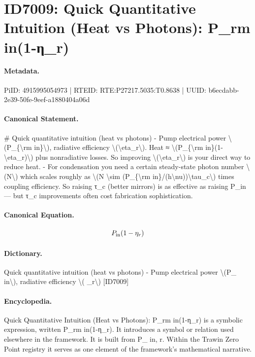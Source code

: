 \section*{ID7009: Quick Quantitative Intuition (Heat vs Photons): P\_rm in(1-η\_r)}
\paragraph{Metadata.}
PiID: 4915995054973 | RTEID: RTE:P27217.5035:T0.8638 | UUID: b6ecdabb-2e39-50fe-9eef-a1880404a06d

\paragraph{Canonical Statement.}
\# Quick quantitative intuition (heat vs photons) - Pump electrical power \textbackslash{}(P\_\{\textbackslash{}rm in\}\textbackslash{}), radiative efficiency \textbackslash{}(\textbackslash{}eta\_r\textbackslash{}). Heat ≈ \textbackslash{}(P\_\{\textbackslash{}rm in\}(1-\textbackslash{}eta\_r)\textbackslash{}) plus nonradiative losses. So improving \textbackslash{}(\textbackslash{}eta\_r\textbackslash{}) is your direct way to reduce heat. - For condensation you need a certain steady-state photon number \textbackslash{}(N\textbackslash{}) which scales roughly as \textbackslash{}(N \textbackslash{}sim (P\_\{\textbackslash{}rm in\}/(h\textbackslash{}nu))\textbackslash{}tau\_c\textbackslash{}) times coupling efficiency. So raising τ\_c (better mirrors) is as effective as raising P\_in — but τ\_c improvements often cost fabrication sophistication.

\paragraph{Canonical Equation.}
\[
P_{\rm in}(1-\eta_r)
\]

\paragraph{Dictionary.}
Quick quantitative intuition (heat vs photons) - Pump electrical power \textbackslash{}(P\_ in\textbackslash{}), radiative efficiency \textbackslash{}( \_r\textbackslash{}) [ID7009]

\paragraph{Encyclopedia.}
Quick Quantitative Intuition (Heat vs Photons): P\_rm in(1-η\_r) is a symbolic expression, written P\_rm in(1-η\_r). It introduces a symbol or relation used elsewhere in the framework. It is built from P\_ in, r. Within the Trawin Zero Point registry it serves as one element of the framework's mathematical narrative.
